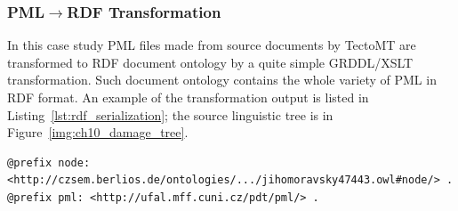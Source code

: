 \subsubsection{PML$\rightarrow$RDF Transformation} \label{sec:pml_to_rdf}

In this case study PML files made from source documents by TectoMT are transformed to RDF document ontology by a quite simple GRDDL/XSLT transformation. Such document ontology contains the whole variety of PML in RDF format. An example of the transformation output is listed in Listing~\ref{lst:rdf_serialization}; the source linguistic tree is in Figure~\ref{img:ch10_damage_tree}.



\begin{listing}[ht]
\begin{verbatim}
@prefix node: <http://czsem.berlios.de/ontologies/.../jihomoravsky47443.owl#node/> .
@prefix pml: <http://ufal.mff.cuni.cz/pdt/pml/> .


\end{verbatim}
\end{listing}
